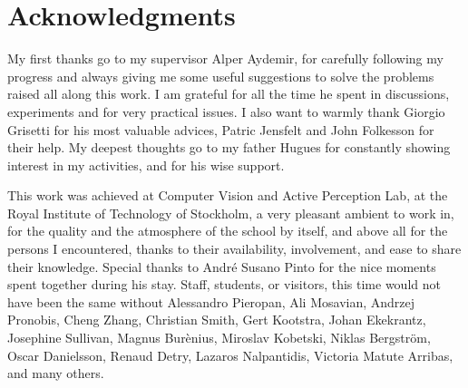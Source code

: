 \chapter{Acknowledgments}
My first thanks go to my supervisor Alper Aydemir, for carefully following my progress and always giving me some useful suggestions to solve the problems  raised all along this work. I am grateful for all the time he spent in discussions, experiments and for very practical issues. I also want to warmly thank Giorgio Grisetti for his most valuable advices, Patric Jensfelt and John Folkesson for their help. My deepest thoughts go to my father Hugues for constantly showing interest in my activities, and for his wise support.

This work was achieved at Computer Vision and Active Perception Lab, at the Royal Institute of Technology of Stockholm, a very pleasant ambient to work in, for the quality and the atmosphere of the school by itself, and above all for the persons I encountered, thanks to their availability, involvement, and ease to share their knowledge. Special thanks to Andr\'{e} Susano Pinto for the nice moments spent together during his stay. Staff, students, or visitors, this time would not have been the same without Alessandro Pieropan, Ali Mosavian, Andrzej Pronobis, Cheng Zhang, Christian Smith, Gert Kootstra, Johan Ekekrantz, Josephine Sullivan, Magnus Bur\`{e}nius, Miroslav Kobetski, Niklas Bergstr\"{o}m, Oscar Danielsson, Renaud Detry, Lazaros Nalpantidis, Victoria Matute Arribas, and many others.
